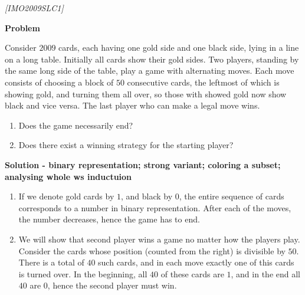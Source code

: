 
%
%

\renewcommand{\theenumi}{\alph{enumi}}




\noindent
 
\filbreak

\begin{problem}
\textit{[IMO2009SLC1]}


\textbf{Problem}

Consider $2009$ cards, each having one gold side and one black side, lying in a line on a long table. Initially all cards show their gold sides. Two players, standing by the same long side of the table, play a game with alternating moves. Each move consists of choosing a block of $50$ consecutive cards, the leftmost of which is showing gold, and turning them all over, so those with showed gold now show black and vice versa. The last player who can make a legal move wins.
\begin{enumerate}
\item Does the game necessarily end?
\item Does there exist a winning strategy for the starting player?
\end{enumerate}


\textbf{Solution - binary representation; strong variant; coloring a subset; analysing whole ws inductuion}
\begin{enumerate}
\item If we denote gold cards by $1$, and black by $0$, the entire sequence of cards  corresponds to a number in binary representation. After each of the moves, the number decreases, hence the game has to end.
\item We will show that second player wins a game no matter how the players play. Consider the cards whose position (counted from the right) is divisible by $50$. There is a total of $40$ such cards, and in each move exactly one of this cards is turned over. In the beginning, all $40$ of these cards are $1$, and in the end all $40$ are $0$, hence the second player must win.
\end{enumerate}
\end{problem}
%

\filbreak

